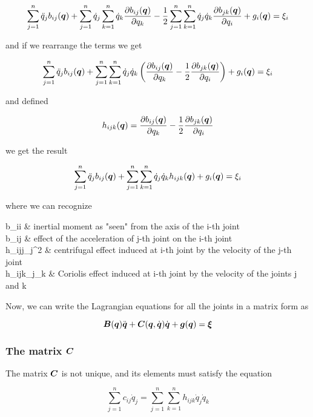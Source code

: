 \[
	\sum_{j=1}^n \ddot{q}_j b_{ij}(\boldsymbol{q}) + \sum_{j=1}^n \dot{q}_j \sum_{k=1}^n \dot{q}_k \frac{\partial b_{ij}(\boldsymbol{q})}{\partial q_k}
	- \frac{1}{2} \sum_{j=1}^n \sum_{k=1}^n \dot{q}_j \dot{q}_k \frac{\partial b_{jk}(\boldsymbol{q})}{\partial q_i} + g_i(\boldsymbol{q}) = \xi_i
\]

and if we rearrange the terms we get

\[
	\sum_{j=1}^n \ddot{q}_j b_{ij}(\boldsymbol{q}) + \sum_{j=1}^n \sum_{k=1}^n \dot{q}_j \dot{q}_k \left( \frac{\partial b_{ij}(\boldsymbol{q})}{\partial q_k} - \frac{1}{2} \frac{\partial b_{jk}(\boldsymbol{q})}{\partial q_i} \right) + g_i(\boldsymbol{q}) = \xi_i
\]

and defined

\[ h_{ijk}(\boldsymbol{q}) = \frac{\partial b_{ij}(\boldsymbol{q})}{\partial q_k} - \frac{1}{2} \frac{\partial b_{jk}(\boldsymbol{q})}{\partial q_i} \]

we get the result

\[
	\sum_{j=1}^n \ddot{q}_j b_{ij}(\boldsymbol{q}) + \sum_{j=1}^n \sum_{k=1}^n \dot{q}_j \dot{q}_k h_{ijk}(\boldsymbol{q}) + g_i(\boldsymbol{q}) = \xi_i
\]

where we can recognize

\begin{conditions}
	b_{ii} & inertial moment as "seen" from the axis of the i-th joint \\
	b_{ij} & effect of the acceleration of j-th joint on the i-th joint \\
	h_{ijj}_j^2 & centrifugal effect induced at i-th joint by the velocity of the j-th joint \\
	h_{ijk}_j_k & Coriolis effect induced at i-th joint by the velocity of the joints j and k
\end{conditions}

Now, we can write the Lagrangian equations for all the joints in a matrix form as

\begin{equation}
    \boldsymbol{B}(\boldsymbol{q})\ddot{\boldsymbol{q}} + \boldsymbol{C}(\boldsymbol{q},\dot{\boldsymbol{q}})\dot{\boldsymbol{q}} + \boldsymbol{g}(\boldsymbol{q}) = \boldsymbol{\xi} \label{eq:dynamics-generalized-forces}
\end{equation}

\subsubsection{The matrix $\boldsymbol{C}$}\label{subsubsec:matrix-c}

The matrix $\boldsymbol{C}$ is not unique, and its elements must satisfy the equation

\[
	\sum_{j=1}^n c_{ij} \dot{q}_j = \sum_{j=1}^n \sum_{k=1}^n h_{ijk} \dot{q}_j \dot{q}_k
\]

